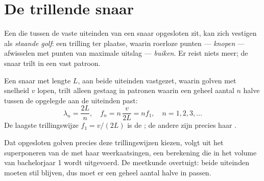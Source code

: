 \section{De trillende snaar}

\begin{definition}\label{def:g12:sound-acoustics:standing-wave}
Een  die tussen de vaste uiteinden van een snaar opgesloten zit, kan
zich vestigen als \emph{staande golf}: een trilling
ter plaatse, waarin roerloze punten --- \emph{knopen} ---
afwisselen met punten van maximale uitslag --- \emph{buiken}.
Er reist niets meer; de snaar trilt in een vast patroon.
\end{definition}

\begin{proposition}\label{prop:g12:sound-acoustics:string-modes}
Een snaar met lengte $L$, aan beide uiteinden vastgezet, waarin golven met
snelheid $v$ lopen, trilt alleen gestaag in patronen waarin een geheel
aantal $n$ halve  tussen de opgelegde  aan de uiteinden
past:
\[ \lambda_n = \frac{2L}{n}, \quad f_n = n\,\frac{v}{2L} = n f_1, \quad n = 1, 2, 3, \dots \]
De laagste trillingswijze $f_1 = v/(2L)$ is de ; de andere zijn
precies haar . \admitted
\end{proposition}

\begin{remark}\label{rem:g12:sound-acoustics:honest}
Dat opgesloten golven precies deze trillingswijzen kiezen, volgt uit het
superponeren van de  met haar weerkaatsingen, een berekening die in
het volume van bachelorjaar 1 wordt uitgevoerd. De meetkunde overtuigt:
beide uiteinden moeten stil blijven, dus moet er een geheel aantal halve
 in passen.
\end{remark}


